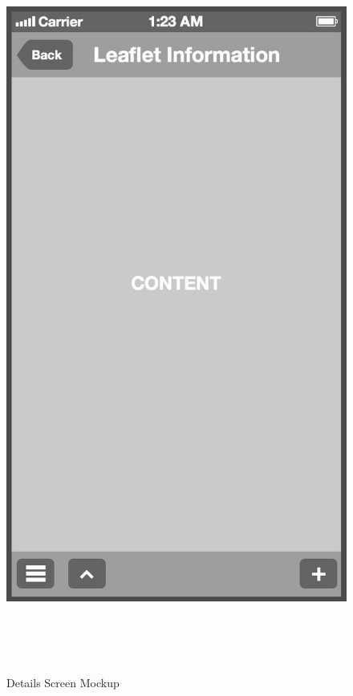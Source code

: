 \begin{figure}[ptb]
\begin{minipage}[b]{0.45\linewidth}
        \includegraphics[width=0.8025\linewidth]{figures/Screen_4_bw.jpg}
        \caption[Pharmaceutical Details Screen]{Details Screen Mockup}
        \label{fig:DetailsScreen}
    \end{minipage}
    \\
    \\
    \\
    \begin{minipage}[b]{0.45\linewidth}
        \centering

\end{minipage}
\end{figure}
